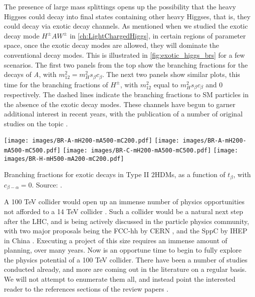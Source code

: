 The presence of large mass splittings opens up the possibility that the heavy Higgses could decay into final states containing other heavy Higgses, that is, they could decay via exotic decay channels. As mentioned when we studied the exotic decay mode $H^\pm AW^\pm$ in \autoref{ch:LightChargedHiggs}, in certain regions of parameter space, once the exotic decay modes are allowed, they will dominate the conventional decay modes. This is illustrated in \autoref{fig:exotic_higgs_brs} for a few scenarios. The first two panels from the top show the branching fractions for the decays of \emph{A}, with $m_{12}^2 = m_H^2 s_\beta c_\beta$. The next two panels show similar plots, this time for the branching fractions of $H^\pm$, with $m_{12}^2$ equal to $m_H^2 s_\beta c_\beta$ and $0$ respectively. The dashed lines indicate the branching fractions to SM particles in the absence of the exotic decay modes. These channels have begun to garner additional interest in recent years, with the publication of a number of original studies on the topic \cite{Dorsch:2014qja,Dorsch:2016tab,Coleppa2013a,Coleppa2014a,Brownson:2013lka,Coleppa:2014cca,Kling2015c,Li:2015lra,Maitra:2014qea,Basso:2012st,Dermisek:2013cxa,Mohn:2005lda,Assamagan:2000ud}. 

\begin{marginfigure}[1cm]
  \centering
  \texttt{[image: images/BR-A-mH200-mA500-mC200.pdf]}
  \texttt{[image: images/BR-A-mH200-mA500-mC500.pdf]}
  \texttt{[image: images/BR-C-mH200-mA500-mC500.pdf]}
  \texttt{[image: images/BR-H-mH500-mA200-mC200.pdf]}
  \caption{Branching fractions for exotic decays in Type II $2$HDMs, as a function of $t_\beta$, with $c_{\beta-\alpha} = 0$. Source: \cite{Kling2016}.}
\label{fig:exotic_higgs_brs}
\end{marginfigure}

A 100 TeV collider would open up an immense number of physics opportunities not afforded to a 14 TeV collider \citep{Arkani-Hamed2015}. 
Such a collider would be a natural next step after the LHC, and is being actively discussed in the particle physics community, with two major proposals being the FCC-hh by CERN \citep{FCC-hh}, and the SppC by IHEP in China \citep{CEPC}. Executing a project of this size requires an immense amount of planning, over many years. Now is an opportune time to begin to fully explore the physics potential of a 100 TeV collider. There have been a number of studies conducted already, and more are coming out in the literature on a regular basis. 
We will not attempt to enumerate them all, and instead point the interested reader to the references sections of the review papers \citep{Arkani-Hamed2015,Contino:2016spe,Golling:2016gvc,Mangano:2016jyj}.


